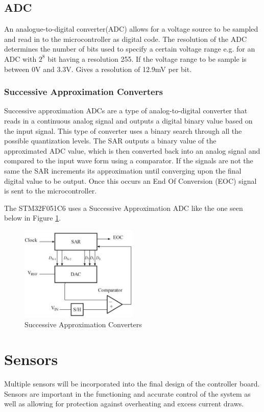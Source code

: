\newpage
\subsection{ADC}
An analogue-to-digital converter(ADC) allows for a voltage source to be sampled and read in to the microcontroller as digital code. The resolution of the ADC determines the number of bits used to specify a certain voltage range e.g. for an ADC with $2^8$ bit having a resolution 255. If the voltage range to be sample is between 0V and 3.3V. Gives a resolution of 12.9mV per bit.

\subsubsection{Successive Approximation Converters}
Successive approximation ADCs are a type of analog-to-digital converter that reads in a continuous analog signal and outputs a digital binary value based on the input signal. This type of converter uses a binary search through all the possible quantization levels. The SAR outputs a binary value of the approximated ADC value, which is then converted back into an analog signal and compared to the input wave form using a comparator. If the signals are not the same the SAR increments its approximation until converging upon the final digital value to be output. Once this occurs an End Of Conversion (EOC) signal is sent to the microcontroller.

The STM32F051C6 uses a Successive Approximation ADC like the one seen below in Figure \ref{fig:SAC}.
\begin{figure}[H]
    \centering
    \includegraphics[width=0.5\textwidth]{SA_ADC_block_diagram.jpg}
    \caption{Successive Approximation Converters \cite{SA_converter}}
    \label{fig:SAC}
\end{figure}





\newpage
\section{Sensors}
Multiple sensors will be incorporated into the final design of the controller board. Sensors are important in the functioning and accurate control of the system as well as allowing for protection against overheating and excess current draws. 

